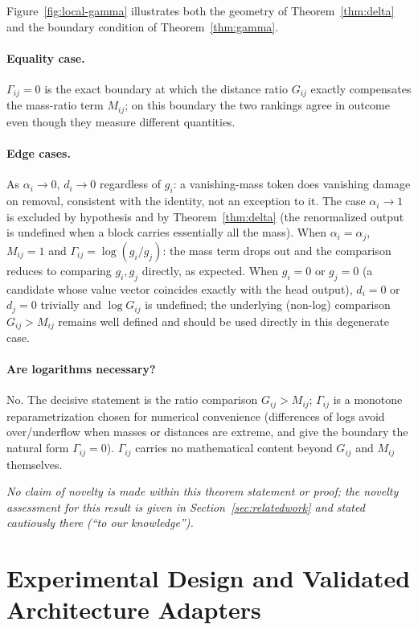 \documentclass[11pt]{article}
\begin{document}
Figure~\ref{fig:local-gamma} illustrates both the geometry of
Theorem~\ref{thm:delta} and the boundary condition of
Theorem~\ref{thm:gamma}.

\paragraph{Equality case.} $\Gamma_{ij}=0$ is the exact boundary at which the
distance ratio $G_{ij}$ exactly compensates the mass-ratio term $M_{ij}$;
on this boundary the two rankings agree in outcome even though they measure
different quantities.

\paragraph{Edge cases.} As $\alpha_i \to 0$, $d_i \to 0$ regardless of
$g_i$: a vanishing-mass token does vanishing damage on removal, consistent
with the identity, not an exception to it. The case $\alpha_i \to 1$ is
excluded by hypothesis and by Theorem~\ref{thm:delta} (the renormalized
output is undefined when a block carries essentially all the mass). When
$\alpha_i = \alpha_j$, $M_{ij}=1$ and $\Gamma_{ij} = \log(g_i/g_j)$: the
mass term drops out and the comparison reduces to comparing $g_i,g_j$
directly, as expected. When $g_i=0$ or $g_j=0$ (a candidate whose value
vector coincides exactly with the head output), $d_i=0$ or $d_j=0$
trivially and $\log G_{ij}$ is undefined; the underlying (non-log)
comparison $G_{ij}>M_{ij}$ remains well defined and should be used directly
in this degenerate case.

\paragraph{Are logarithms necessary?} No. The decisive statement is the
ratio comparison $G_{ij}>M_{ij}$; $\Gamma_{ij}$ is a monotone
reparametrization chosen for numerical convenience (differences of logs
avoid over/underflow when masses or distances are extreme, and give the
boundary the natural form $\Gamma_{ij}=0$). $\Gamma_{ij}$ carries no
mathematical content beyond $G_{ij}$ and $M_{ij}$ themselves.

\emph{No claim of novelty is made within this theorem statement or proof;
the novelty assessment for this result is given in Section~\ref{sec:relatedwork}
and stated cautiously there (``to our knowledge'').}

\section{Experimental Design and Validated Architecture Adapters}
\label{sec:design}
\end{document}
